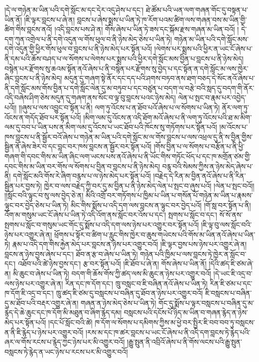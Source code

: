 །དེ་ལ་གཉེན་མ་ཡིན་པའི་དགེ་སློང་མ་དང་དེར་འདུ་ཤེས་པ་དང་། ཐེ་ཚོམ་པའི་ཡན་ལག་གཞན་གོང་དུ་བསྟན་པ་ཡིན་ནོ། །ཇི་ལྟར་བླངས་པ་ཞེ་ན། བླངས་པ་ཞེས་སྨྲས་པ་ཡིན་ཏེ་ཁ་རོག་པའམ་ཚིག་ལས་གཞན་བས་མ་ཡིན་གྱི་ཚིག་གིས་བླངས་ནའོ། །འདི་བླངས་པས་ཤེ་ན། གོས་ཞེས་པ་ཡིན་ཏེ་ཟས་དང་སྐོམ་རྫས་གཞན་མ་ཡིན་བའོ། །
དེ་དག་ཀུན་འགྲེལ་པ་ནི་དགེ་འདུན་ལ་གོས་ཕུལ་བ་ནི་ཉེས་མེད་ཅེས་པ་ཡིན་ཏེ། གཉེན་མ་ཡིན་པའི་དགེ་སློང་མས་དགེ་འདུན་གྱི་ཕྱིར་གོས་ཕུལ་བ་བླངས་པ་ནི་ཉེས་མེད་པར་སྟོན་པའོ། །ལེགས་པར་སྨྲས་པའི་ཕྱིར་ན་ཡང་ངོ་ཞེས་པ་ནི་དམ་པའི་ཆོས་བཤད་པ་ལ་སོགས་པ་ལེགས་པར་སྨྲས་པའི་ཕྱིར་དགེ་སློང་མས་བྱིན་པ་བླངས་པ་ནི་ཉེས་མེད། བསྙེན་པར་རྫོགས་སུ་ཆའམ་སྟོན་ནའོ་ཞེས་པ་ནི་བསྙེན་པར་རྫོགས་སུ་བྱེད་པ་དང་སྟོན་ན་དགེ་སློང་མ་ལས་ཁྱེར་ཞིང་བླངས་པ་ནི་ཉེས་མེད། མདུན་དུ་གཞག་སྟེ་ནོར་དང་དད་པའི་ཤགས་བཏབ་ནས་ཐག་བཅད་དེ་སོང་ནའོ་ཞེས་པ་ནི་དགེ་སློང་མས་གོས་བྱིན་པ་དགེ་སློང་ལེན་དུ་མ་བཏུབ་པ་དང་བཙུན་པ་བདག་ལ་བརྩེ་བའི་སླད་དུ་བདག་གི་ནོར་འདི་བཞེས་ཤིག་ཅེས་མདུན་དུ་གཞག་ནས་སོང་བ་ལྟ་བུ་བླངས་པའང་ཉེས་མེད། ལེན་པ་སྤང་བ་རྣམ་པར་འབྱེད་པའོ།། །།ཞུས་པ་ལས་འབྱུང་བ་སྟོན་པ་ནི། ལག་ཏུ་འོངས་པ་ན་ཐོབ་པའོ་ཞེས་པ་ལ་སོགས་པ་ཡིན་ཏེ། ནོར་ལག་ཏུ་འོངས་ན་གདོད་ཐོབ་པར་སྟོན་པའོ། །མིག་ལམ་དུ་འོངས་ན་འདི་ཐོག་མའོ་ཞེས་པ་ནི་ལག་ཏུ་འོངས་པའི་ཐ་མ་མིག་ལམ་དུ་བབ་པ་ཡིན་པས་ན་མིག་ལམ་དུ་འོངས་པ་ཡང་ཐོབ་པའི་ཁོངས་སུ་གཏོགས་པར་སྟོན་པའོ། །མ་འོངས་པ་ཁས་བླངས་པ་ནི་སྦྱོར་བའོ་ཞེས་པ་གཉེན་མ་ཡིན་པའི་དགེ་སློང་མ་ལ་གོས་བླངས་པ་ལས་འཕྲལ་དུ་ནི་ས་བྱིན་གྱིས་སྦྱིན་ནོ་ཞེས་ཟེར་བ་དང་བླང་བར་ཁས་བླངས་ན་སྦྱོར་བར་སྟོན་པའོ། །གོས་བྱིན་པ་ལ་སོགས་པ་བརྩོན་པ་ནི་ཕྱི་གཞག་གི་དབང་གིས་མ་ཡིན་ཞིང་ལག་ཡངས་པས་ནའོ་ཞེས་པ་ནི་ཡོང་གིས་གཏོང་ཕོད་པ་དང་ཁ་མགྲོན་ཙམ་གྱི་དབང་གིས་མ་ཡིན་བར་གོས་ལ་སོགས་པ་བྱིན་བ་བླངས་པ་ནི་ཉེས་མེད། བརྙ་བའི་སེམས་ཀྱིས་ན་ཉེས་མེད་ཞེས་པ་ནི། དགེ་སློང་མའི་གོས་རེ་ཞིག་བརྙས་པ་ལ་ཉེས་མེད་པར་སྟོན་པའོ། །བརྗེད་དེ་རིན་མ་བྱིན་ནའོ་ཞེས་པ་ནི་རིན་སྦྱིན་པར་བྱས་ཏེ། ཁྱེར་བ་ལས་བརྗེད་ཀྱི་བར་དུ་མ་བྱིན་པ་ནི་ཉེས་མེད་ལེན་པ་སྤང་བ་ཞུས་པའོ། །ལེན་པ་སྤང་བའོ།། །།སློང་བའི་ལྟུང་བ་སུ་ལས་བྱེད་ཅེ་ན། མིའི་འགྲོ་བར་གཏོགས་པ་ཁྱིམ་པ་ཡིན་པ་གསོན་པོ་གཉེན་མ་ཡིན་པ་རྣམས་ལྟུང་བར་བྱེད་ཅེས་པ་ཡིན་ཏེ། མིང་གིས་སྨོས་པ་འདི་དག་ལས་བླངས་ན་ལྟུང་བར་བྱེད་པའོ། །གོ་སླ་བར་སྟོན་པ་ནི། འོག་མ་གསུམ་ཡང་ངོ་ཞེས་པ་ཡིན་ཏེ་འདི་འོག་ནས་སློང་བར་འོས་པ་དང་། སྤགས་པ་སློང་བ་དང་། སོ་སོ་ནས་སྤགས་པ་སློང་བ་གསུམ་ཡང་གོང་དུ་སྨོས་པ་འདི་དག་ལས་ཉེས་པར་འགྱུར་བར་སྟོན་པའོ། །ཇི་ལྟ་བུ་ལས་སློང་བའི་ཉེས་པར་འགྱུར་ཞེ་ན། ཕྲོགས་པ་སྟོར་བ་ཚིག་པ་རླུང་གིས་ཁྱེར་བ་ཆུས་གཡེངས་པའི་གོས་མ་ཡིན་ནའོ་ཞེས་པ་ཡིན་ཏེ། རྣམ་པ་འདི་དག་གིས་རྐྱེན་མེད་པར་བླངས་ན་ཉེས་པར་འགྱུར་བའོ། །ཇི་ལྟར་བྱས་པས་ཉེས་པར་འགྱུར་ཞེ་ན། བླངས་ན་ཉེས་བྱས་ཞེས་པ་དང་། ཐོབ་ན་རྩ་བ་ཞེས་པ་ཡིན་ཏེ། གཉེན་པའི་ཁྱིམ་པ་ལས་བླངས་ཏེ་ཁྱེར་ན་སློང་བ་དང་། འཐོབ་པའི་ཚེ་ཉེས་བྱས་དང་། རྩ་བར་སྟོན་པའོ། །ཇི་ཐོབ་པ་ཞེ་ན། གོས་ཞེས་པ་ཡིན་ནོ། །དེའི་ཚད་ཇི་ཙམ་ཞེ་ན། མི་ཆུང་བ་ཞེས་པ་ཡིན་ཏེ། བདག་གི་ཆོས་གོས་ཀྱི་ཚད་ལས་མི་ཆུང་ན་ཉེས་པར་འགྱུར་བའོ། །དེ་ཡང་ཇི་འདྲ་བ་ལས་ཉེས་པར་འགྱུར་ཞེ་ན། རིན་དང་ཁ་དོག་དང་། ཁྲུ་བསླང་བ་ཇི་བཞིན་ནའོ་ཞེས་པ་ཡིན་ཏེ། རིན་ཇི་ཙམ་པ་དང་ཁ་དོག་ཇི་འདྲ་བ་དང་། ཁྲུ་ཚད་ཇི་ཙམ་དུ་བསླངས་པ་བཞིན་དུ་ཐོབ་ན་ཉེས་པར་འགྱུར་བའོ། ཇི་བསླངས་པ་བཞིན་དུ་མ་ཐོབ་པའི་བརྡར་འགྱུར་ཞེ་ན། གཞན་ན་ཉེས་མེད་ཅེས་པ་ཡིན་ཏེ། གོང་དུ་སྨོས་པ་ལྟར་བསླངས་པ་བཞིན་དུ་མ་རྙེད་དེ་ཆེ་ཆུང་དང་ཁ་དོག་མི་མཐུན་བ་ཞིག་རྙེད་དམ། བསླངས་པའི་དངོས་པོ་ཉིད་མ་ཡིན་བ་གཞན་རྙེད་ན་ཉེས་མེད་པར་སྟོན་པའོ། །དང་པོ་སློང་བའི་ཚེ། ཁ་དོག་ལ་སོགས་པ་དམིགས་ཀྱིས་མ་ཕྱེ་བར་སྤྱིར་ཇི་བབ་བབ་ཏུ་བསླངས་ན་ནི་ཇི་རྙེད་པ་ཉེས་པར་འགྱུར་བའོ། །རས་མ་དང་ཁ་ཚར་བླངས་པ་ཡང་ངོ་ཞེས་པ་ནི་འདི་དག་བླངས་ཏེ་རྙེད་པའི་ཞར་ལ་གོས་རངས་པ་རྙེད་ཀྱང་ཉེས་པར་མི་འགྱུར་བའོ། །རྒྱུ་སྤུན་ནི་འབྲིའོ་ཞེས་པ་ནི་གོས་ལངས་པའི་རྒྱུ་སྤུན་བསླངས་ཏེ་རྙེད་ན་ཡང་ཉེས་པ་རངས་པར་མི་འགྱུར་བའོ། 